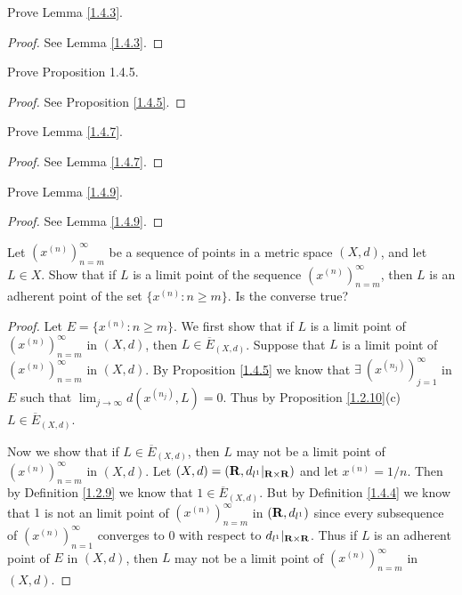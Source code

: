 \exercisesection

\begin{exercise}\label{ex 1.4.1}
    Prove Lemma \ref{1.4.3}.
\end{exercise}

\begin{proof}
    See Lemma \ref{1.4.3}.
\end{proof}

\begin{exercise}\label{ex 1.4.2}
    Prove Proposition 1.4.5.
\end{exercise}

\begin{proof}
    See Proposition \ref{1.4.5}.
\end{proof}

\begin{exercise}\label{ex 1.4.3}
    Prove Lemma \ref{1.4.7}.
\end{exercise}

\begin{proof}
    See Lemma \ref{1.4.7}.
\end{proof}

\begin{exercise}\label{ex 1.4.4}
    Prove Lemma \ref{1.4.9}.
\end{exercise}

\begin{proof}
    See Lemma \ref{1.4.9}.
\end{proof}

\begin{exercise}\label{ex 1.4.5}
    Let \((x^{(n)})_{n = m}^\infty\) be a sequence of points in a metric space \((X, d)\), and let \(L \in X\).
    Show that if \(L\) is a limit point of the sequence \((x^{(n)})_{n = m}^\infty\), then \(L\) is an adherent point of the set \(\{x^{(n)} : n \geq m\}\).
    Is the converse true?
\end{exercise}

\begin{proof}
    Let \(E = \{x^{(n)} : n \geq m\}\).
    We first show that if \(L\) is a limit point of \((x^{(n)})_{n = m}^\infty\) in \((X, d)\), then \(L \in \overline{E}_{(X, d)}\).
    Suppose that \(L\) is a limit point of \((x^{(n)})_{n = m}^\infty\) in \((X, d)\).
    By Proposition \ref{1.4.5} we know that \(\exists\ (x^{(n_j)})_{j = 1}^\infty\) in \(E\) such that \(\lim_{j \to \infty} d(x^{(n_j)}, L) = 0\).
    Thus by Proposition \ref{1.2.10}(c) \(L \in \overline{E}_{(X, d)}\).

    Now we show that if \(L \in \overline{E}_{(X, d)}\), then \(L\) may not be a limit point of \((x^{(n)})_{n = m}^\infty\) in \((X, d)\).
    Let \((X, d) = (\mathbf{R}, d_{l^1}|_{\mathbf{R} \times \mathbf{R}})\) and let \(x^{(n)} = 1 / n\).
    Then by Definition \ref{1.2.9} we know that \(1 \in \overline{E}_{(X, d)}\).
    But by Definition \ref{1.4.4} we know that \(1\) is not an limit point of \((x^{(n)})_{n = m}^\infty\) in \((\mathbf{R}, d_{l^1})\) since every subsequence of \((x^{(n)})_{n = 1}^\infty\) converges to \(0\) with respect to \(d_{l^1}|_{\mathbf{R} \times \mathbf{R}}\).
    Thus if \(L\) is an adherent point of \(E\) in \((X, d)\), then \(L\) may not be a limit point of \((x^{(n)})_{n = m}^\infty\) in \((X, d)\).
\end{proof}

